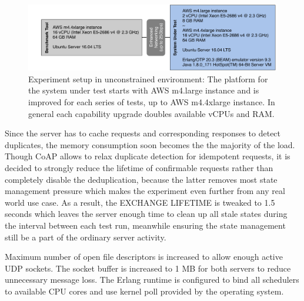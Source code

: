 \begin{figure}[!htbp]
\centering
\includegraphics[scale = 0.8]{experiment_setting_aws}
\caption[Experiment setup in unconstrained environment]{Experiment setup in unconstrained environment: The platform for the system under test starts with AWS m4.large instance and is improved for each series of tests, up to AWS m4.4xlarge instance. In general each capability upgrade doubles available vCPUs and RAM.} 
\label{fig:experiment_setting_aws}
\end{figure}

Since the server has to cache requests and corresponding responses to detect duplicates, the memory consumption soon becomes the the majority of the load. Though CoAP allows to relax duplicate detection for idempotent requests, it is decided to strongly reduce the lifetime of confirmable requests rather than completely disable the deduplication, because the latter removes most state management pressure which makes the experiment even further from any real world use case. As a result, the EXCHANGE LIFETIME is tweaked to 1.5 seconds which leaves the server enough time to clean up all stale states during the interval between each test run, meanwhile ensuring the state management still be a part of the ordinary server activity.

Maximum number of open file descriptors is increased to allow enough active UDP sockets. The socket buffer is increased to 1 MB for both servers to reduce unnecessary message loss. The Erlang runtime is configured to bind all schedulers to available CPU cores and use kernel poll provided by the operating system. 

